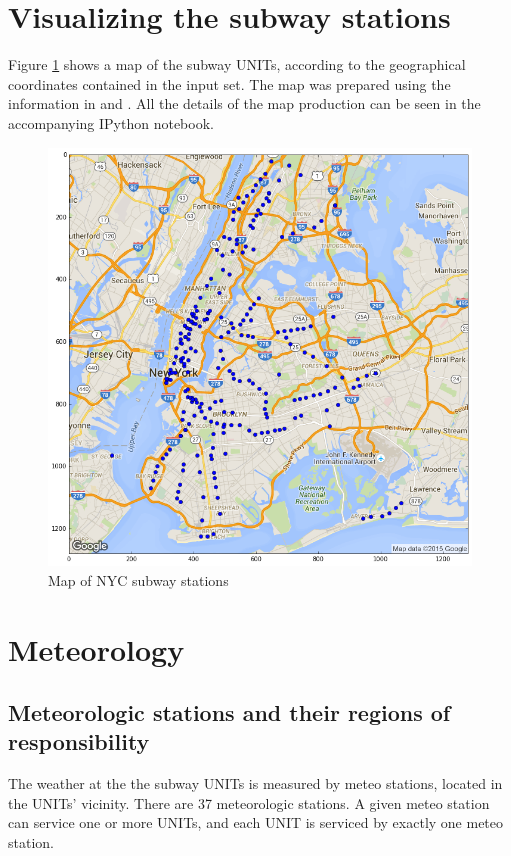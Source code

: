 \documentclass{article}
\begin{document}
\section{Visualizing the subway stations}

Figure \ref{fig:subway_stations} shows a map of the subway UNITs, according to the geographical coordinates contained in the input set. The map was prepared using the information in \cite{wiki_mercator} and \cite{google_sperical_proj}. All the details of the map production can be seen in the accompanying IPython notebook.

\begin{figure}[ht]
\centering
\includegraphics[scale=0.6]{map_stations.png}
\caption{Map of NYC subway stations}
\label{fig:subway_stations}
\end{figure}

\section{Meteorology}

\subsection{Meteorologic stations and their regions of responsibility}

The weather at the the subway UNITs is measured by meteo stations, located in the UNITs' vicinity. There are 37 meteorologic stations. A given meteo station can service one or more UNITs, and each UNIT is serviced by exactly one meteo station.
\end{document}
